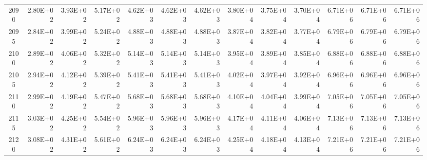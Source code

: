 \documentclass{article}
\begin{document}
\begin{table}
\begin{tabular}{crrr|rrr|rrr|rrr}
2090     & 2.80E+02 & 3.93E+02 & 5.17E+02 & 4.62E+03 & 4.62E+03 & 4.62E+03 & 3.80E+04 & 3.75E+04 & 3.70E+04 & 6.71E+06 & 6.71E+06 & 6.71E+06 \\
2095     & 2.84E+02 & 3.99E+02 & 5.24E+02 & 4.88E+03 & 4.88E+03 & 4.88E+03 & 3.87E+04 & 3.82E+04 & 3.77E+04 & 6.79E+06 & 6.79E+06 & 6.79E+06 \\
2100     & 2.89E+02 & 4.06E+02 & 5.32E+02 & 5.14E+03 & 5.14E+03 & 5.14E+03 & 3.95E+04 & 3.89E+04 & 3.85E+04 & 6.88E+06 & 6.88E+06 & 6.88E+06 \\
2105     & 2.94E+02 & 4.12E+02 & 5.39E+02 & 5.41E+03 & 5.41E+03 & 5.41E+03 & 4.02E+04 & 3.97E+04 & 3.92E+04 & 6.96E+06 & 6.96E+06 & 6.96E+06 \\
2110     & 2.99E+02 & 4.19E+02 & 5.47E+02 & 5.68E+03 & 5.68E+03 & 5.68E+03 & 4.10E+04 & 4.04E+04 & 3.99E+04 & 7.05E+06 & 7.05E+06 & 7.05E+06 \\
2115     & 3.03E+02 & 4.25E+02 & 5.54E+02 & 5.96E+03 & 5.96E+03 & 5.96E+03 & 4.17E+04 & 4.11E+04 & 4.06E+04 & 7.13E+06 & 7.13E+06 & 7.13E+06 \\
2120     & 3.08E+02 & 4.31E+02 & 5.61E+02 & 6.24E+03 & 6.24E+03 & 6.24E+03 & 4.25E+04 & 4.18E+04 & 4.13E+04 & 7.21E+06 & 7.21E+06 & 7.21E+06
\end{tabular}
\end{table}
\end{document}
